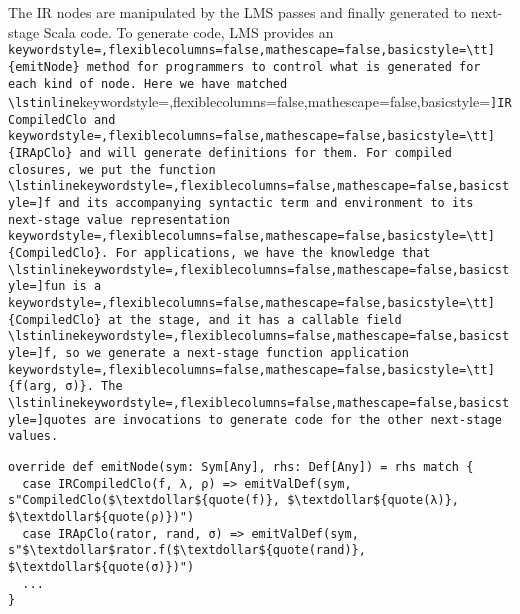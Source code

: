The IR nodes are manipulated by the LMS passes and finally generated to
next-stage Scala code. To generate code, LMS provides an \lstinline[keywordstyle=,flexiblecolumns=false,mathescape=false,basicstyle=\tt]{emitNode} method for
programmers to control what is generated for each kind of node. Here we have
matched \lstinline[keywordstyle=,flexiblecolumns=false,mathescape=false,basicstyle=\tt]{IRCompiledClo} and \lstinline[keywordstyle=,flexiblecolumns=false,mathescape=false,basicstyle=\tt]{IRApClo} and will generate definitions for them.
For compiled closures, we put the function \lstinline[keywordstyle=,flexiblecolumns=false,mathescape=false,basicstyle=\tt]{f} and its accompanying syntactic term
and environment to its next-stage value representation \lstinline[keywordstyle=,flexiblecolumns=false,mathescape=false,basicstyle=\tt]{CompiledClo}. For
applications, we have the knowledge that \lstinline[keywordstyle=,flexiblecolumns=false,mathescape=false,basicstyle=\tt]{fun} is a \lstinline[keywordstyle=,flexiblecolumns=false,mathescape=false,basicstyle=\tt]{CompiledClo} at the stage,
and it has a callable field \lstinline[keywordstyle=,flexiblecolumns=false,mathescape=false,basicstyle=\tt]{f}, so we generate a next-stage function
application \lstinline[keywordstyle=,flexiblecolumns=false,mathescape=false,basicstyle=\tt]{f(arg, σ)}. The \lstinline[keywordstyle=,flexiblecolumns=false,mathescape=false,basicstyle=\tt]{quote}s are invocations to generate code for the
other next-stage values.
\begin{lstlisting}
override def emitNode(sym: Sym[Any], rhs: Def[Any]) = rhs match {
  case IRCompiledClo(f, λ, ρ) => emitValDef(sym, s"CompiledClo($\textdollar${quote(f)}, $\textdollar${quote(λ)}, $\textdollar${quote(ρ)})")
  case IRApClo(rator, rand, σ) => emitValDef(sym, s"$\textdollar$rator.f($\textdollar${quote(rand)}, $\textdollar${quote(σ)})")
  ...
}
\end{lstlisting}
